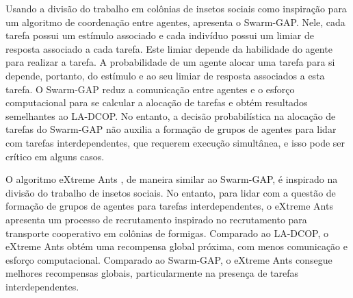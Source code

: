 Usando a divisão do trabalho em colônias de insetos sociais como inspiração para um algoritmo de coordenação entre agentes, \cite{Ferreira2008} apresenta o Swarm-GAP. Nele, cada tarefa possui um estímulo associado e cada indivíduo possui um limiar de resposta associado a cada tarefa. Este limiar depende da habilidade do agente para realizar a tarefa. A probabilidade de um agente alocar uma tarefa para si depende, portanto, do estímulo e ao seu limiar de resposta associados a esta tarefa. O Swarm-GAP reduz a comunicação entre agentes e o esforço computacional para se calcular a alocação de tarefas e obtém resultados semelhantes ao LA-DCOP. No entanto, a decisão probabilística na alocação de tarefas do Swarm-GAP não auxilia a formação de grupos de agentes para lidar com tarefas interdependentes, que requerem execução simultânea, e isso pode ser crítico em alguns casos.

O algoritmo eXtreme Ants \cite{Santos2009F}, de maneira similar ao Swarm-GAP, é inspirado na divisão do trabalho de insetos sociais. No entanto, para lidar com a questão de formação de grupos de agentes para tarefas interdependentes, o eXtreme Ants apresenta um processo de recrutamento inspirado no recrutamento para transporte cooperativo em colônias de formigas. Comparado ao LA-DCOP, o eXtreme Ants obtém uma recompensa global próxima, com menos comunicação e esforço computacional. Comparado ao Swarm-GAP, o eXtreme Ants consegue melhores recompensas globais, particularmente na presença de tarefas interdependentes.
